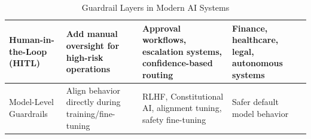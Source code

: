 \documentclass[10pt,a4paper]{article}
\begin{document}
\begin{table}[H]
\begin{tabular}{|p{3.2cm}|p{3.5cm}|p{5.2cm}|p{3.5cm}|}
\hline

Human-in-the-Loop (HITL) &
Add manual oversight for high-risk operations &
Approval workflows, escalation systems, confidence-based routing &
Finance, healthcare, legal, autonomous systems \\

\hline

Model-Level Guardrails &
Align behavior directly during training/fine-tuning &
RLHF, Constitutional AI, alignment tuning, safety fine-tuning &
Safer default model behavior \\

\hline

\end{tabular}

\caption{Guardrail Layers in Modern AI Systems}
\label{tab:guardrails}

\end{table}
\end{document}
